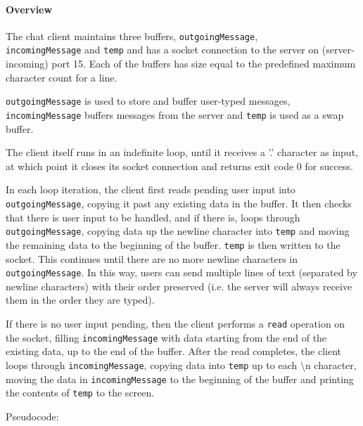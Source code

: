 \documentclass[]{article}
\begin{document}
\paragraph{Overview} The chat client maintains three buffers, \texttt{outgoingMessage}, \\ \texttt{incomingMessage} and \texttt{temp} and has a socket connection to the server on (server-incoming) port 15. Each of the buffers has size equal to the predefined maximum character count for a line.

\texttt{outgoingMessage} is used to store and buffer user-typed messages, \\ \texttt{incomingMessage} buffers messages from the server and \texttt{temp} is used as a swap buffer.

The client itself runs in an indefinite loop, until it receives a '.' character as input, at which point it closes its socket connection and returns exit code 0 for success. 

In each loop iteration, the client first reads pending user input into \\ \texttt{outgoingMessage}, copying it past any existing data in the buffer. It then checks that there is user input to be handled, and if there is, loops through \texttt{outgoingMessage}, copying data up the newline character into \texttt{temp} and moving the remaining data to the beginning of the buffer. \texttt{temp} is then written to the socket. This continues until there are no more newline characters in \texttt{outgoingMessage}. In this way, users can send multiple lines of text (separated by newline characters) with their order preserved (i.e. the server will always receive them in the order they are typed).

If there is no user input pending, then the client performs a \texttt{read} operation on the socket, filling \texttt{incomingMessage} with data starting from the end of the existing data, up to the end of the buffer. After the read completes, the client loops through \texttt{incomingMessage}, copying data into \texttt{temp} up to each \textbackslash n character, moving the data in \texttt{incomingMessage} to the beginning of the buffer and printing the contents of \texttt{temp} to the screen. \\

\pagebreak

\noindent Pseudocode:
\end{document}
